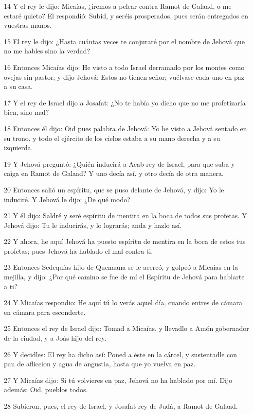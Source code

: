 \par 14 Y el rey le dijo: Micaías, ¿iremos a pelear contra Ramot de Galaad, o me estaré quieto? El respondió: Subid, y seréis prosperados, pues serán entregados en vuestras manos.
\par 15 El rey le dijo: ¿Hasta cuántas veces te conjuraré por el nombre de Jehová que no me hables sino la verdad?
\par 16 Entonces Micaías dijo: He visto a todo Israel derramado por los montes como ovejas sin pastor; y dijo Jehová: Estos no tienen señor; vuélvase cada uno en paz a su casa.
\par 17 Y el rey de Israel dijo a Josafat: ¿No te había yo dicho que no me profetizaría bien, sino mal?
\par 18 Entonces él dijo: Oid pues palabra de Jehová: Yo he visto a Jehová sentado en su trono, y todo el ejército de los cielos estaba a su mano derecha y a su izquierda.
\par 19 Y Jehová preguntó: ¿Quién inducirá a Acab rey de Israel, para que suba y caiga en Ramot de Galaad?  Y uno decía así, y otro decía de otra manera.
\par 20 Entonces salió un espíritu, que se puso delante de Jehová, y dijo: Yo le induciré. Y Jehová le dijo: ¿De qué modo?
\par 21 Y él dijo: Saldré y seré espíritu de mentira en la boca de todos sus profetas. Y Jehová dijo: Tu le inducirás, y lo lograrás; anda y hazlo así.
\par 22 Y ahora, he aquí Jehová ha puesto espíritu de mentira en la boca de estos tus profetas; pues Jehová ha hablado el mal contra ti.
\par 23 Entonces Sedequías hijo de Quenaana se le acercó, y golpeó a Micaías en la mejilla, y dijo: ¿Por qué camino se fue de mí el Espíritu de Jehová para hablarte a ti?
\par 24 Y Micaías respondio: He aquí tú lo verás aquel día, cuando entres de cámara en cámara para esconderte.
\par 25 Entonces el rey de Israel dijo: Tomad a Micaías, y llevadlo a Amón gobernador de la ciudad, y a Joás hijo del rey.
\par 26 Y decidles: El rey ha dicho así: Poned a éste en la cárcel, y sustentadle con pan de afliccion y agua de angustia, hasta que yo vuelva en paz.
\par 27 Y Micaías dijo: Si tú volvieres en paz, Jehová no ha hablado por mí. Dijo además: Oid, pueblos todos.
\par 28 Subieron, pues, el rey de Israel, y Josafat rey de Judá, a Ramot de Galaad.
